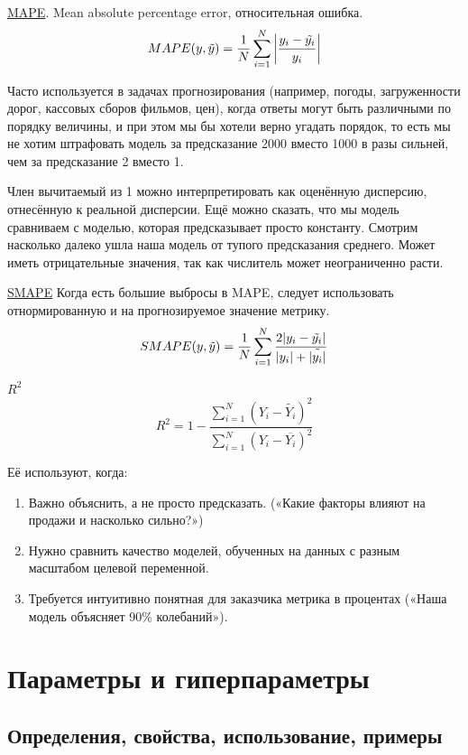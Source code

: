 \documentclass[a4paper, 14pt]{article}
\begin{document}
    \underline{MAPE}.
    Mean absolute percentage error, относительная ошибка.
    \[ MAPE(y,\tilde{y}) = \frac{1}{N} \sum_{i=1}^N \abs{\frac{y_i - \tilde{y_i}}{y_i}} \]
    
    Часто используется в задачах прогнозирования (например, погоды, загруженности дорог, кассовых сборов фильмов, цен),
    когда ответы могут быть различными по порядку величины, и при этом мы бы хотели верно угадать порядок, то есть мы не
    хотим штрафовать модель за предсказание 2000 вместо 1000 в разы сильней, чем за предсказание 2 вместо 1.
    
    Член вычитаемый из 1 можно интерпретировать как оценённую дисперсию, отнесённую к реальной дисперсии.
    Ещё можно сказать, что мы модель сравниваем с моделью, которая предсказывает просто константу.
    Смотрим насколько далеко ушла наша модель от тупого предсказания среднего.
    Может иметь отрицательные значения, так как числитель может неограниченно расти.
    
    \underline{SMAPE}
    Когда есть большие выбросы в MAPE, следует использовать отнормированную и на прогнозируемое значение метрику.
    \[ SMAPE(y,\tilde{y}) = \frac{1}{N} \sum_{i=1}^N \frac{2 \abs{y_i - \tilde{y_i}}}{\abs{y_i} + \tilde{\abs{y_i}}} \]
    
    \underline{$R^2$}
    \[ R^2 = 1 - \frac{\sum_{i=1}^N (Y_i - \tilde{Y_i})^2}{\sum_{i=1}^N (Y_i - \overline{Y_i})^2} \]
    
    Её используют, когда:
    
    \begin{enumerate}
        \item Важно объяснить, а не просто предсказать.
        («Какие факторы влияют на продажи и насколько сильно?»)
        \item Нужно сравнить качество моделей, обученных на данных с разным масштабом целевой переменной.
        \item Требуется интуитивно понятная для заказчика метрика в процентах («Наша модель объясняет 90\% колебаний»).
    \end{enumerate}
    
    \section{Параметры и гиперпараметры}
    
    \subsection{Определения, свойства, использование, примеры}
    
\end{document}
